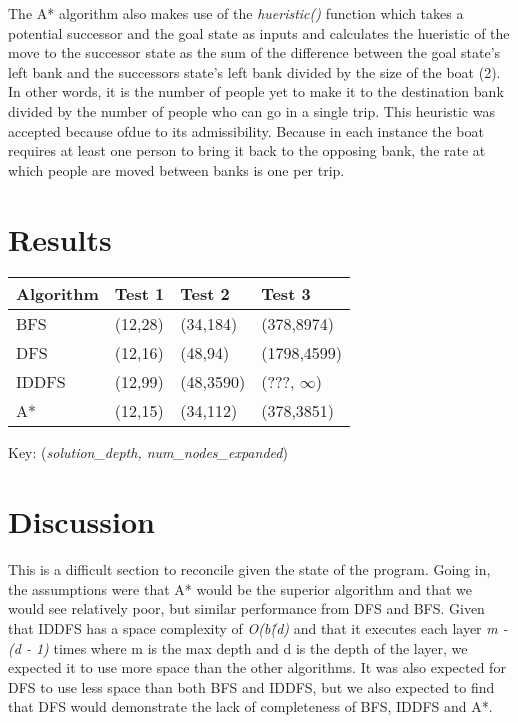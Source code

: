 \documentclass[journal]{IEEEtran}
\begin{document}
\noindent The A* algorithm also makes use of the \textit{hueristic()} function
which takes a potential successor and the goal state as inputs and calculates the
hueristic of the move to the successor state as the sum of the difference between
the goal state's left bank and the successors state's left bank divided by
the size of the boat (2). In other words, it is the number of people yet to make 
it to the destination bank divided by the number of people who can go in a single
trip. This heuristic was accepted because ofdue to its admissibility. Because in each
instance the boat requires at least one person to bring it back to the opposing
bank, the rate at which people are moved between banks is one per trip. \medskip



\section{Results}
\begin{center}
 \begin{tabular}{|p{2cm} p{2cm} p{2cm} p{2cm}|} 
 \hline
 Algorithm & Test 1 & Test 2 & Test 3 \\ [0.5ex] 
 \hline\hline
 BFS & (12,28) & (34,184) & (378,8974) \\ 
 \hline
 DFS & (12,16) & (48,94) & (1798,4599) \\
 \hline
 IDDFS & (12,99) & (48,3590) & (???, $\infty$) \\
 \hline
 A* & (12,15) & (34,112) & (378,3851) \\ [1ex] 
 \hline
\end{tabular}
\end{center}
\begin{center}
Key: (\textit{solution\_depth, num\_nodes\_expanded}) \\ \medskip
\end{center}


\section{Discussion}
\noindent This is a difficult section to reconcile given the state of the program. 
Going in, the assumptions were that A* would be the superior algorithm and that we
would see relatively poor, but similar performance from DFS and BFS. Given that
IDDFS has a space complexity of \textit{O(b\^(d)} and that it executes each layer
\textit{m - (d - 1)} times where m is the max depth and d is the depth of the layer,
we expected it to use more space than the other algorithms. It was also expected for 
DFS to use less space than both BFS and IDDFS, but we also expected to find that DFS 
would demonstrate the lack of completeness of BFS, IDDFS and A*. \smallskip
\end{document}
